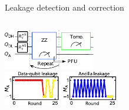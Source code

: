 \documentclass[xcolor={table}]{beamer}
\begin{document}
\begin{frame}{Leakage detection and correction}
  \vspace{-0.9cm}
  \begin{center}
    \begin{columns}
      \column{6cm}
      \begin{center}
        \includegraphics[width=4cm]{repeat_z}\\\vspace{0.4cm}
        \includegraphics[width=5cm]{leak_types}\\\vspace{0.6cm}
      \end{center}
      \column{6cm}
      \begin{center}
      \end{center}
    \end{columns}
  \end{center}
\end{frame}
\end{document}
